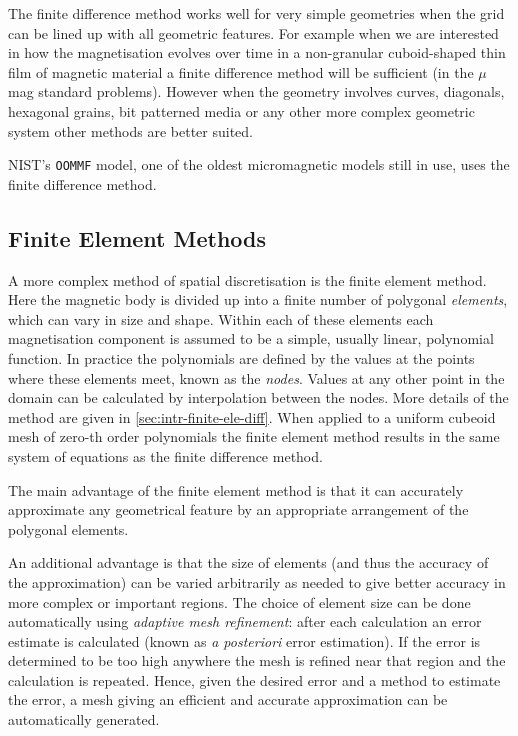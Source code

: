 The finite difference method works well for very simple geometries when the grid can be lined up with all geometric features. 
For example when we are interested in how the magnetisation evolves over time in a non-granular cuboid-shaped thin film of magnetic material a finite difference method will be sufficient (\eg in the $\mu$mag standard problems\cite{mumag-website}). 
However when the geometry involves curves, diagonals, hexagonal grains, bit patterned media or any other more complex geometric system other methods are better suited.

NIST's \texttt{OOMMF} model, one of the oldest micromagnetic models still in use, uses the finite difference method\cite{oommf-website}.


\subsection{Finite Element Methods}
\label{sec:sd-finite-elem-meth}

A more complex method of spatial discretisation is the finite element method\cite{HowardElmanDavidSilvester2006}.
Here the magnetic body is divided up into a finite number of polygonal \emph{elements}, which can vary in size and shape.
Within each of these elements each magnetisation component is assumed to be a simple, usually linear, polynomial function.
In practice the polynomials are defined by the values at the points where these elements meet, known as the \emph{nodes}.
Values at any other point in the domain can be calculated by interpolation between the nodes. More details of the method are given in \autoref{sec:intr-finite-ele-diff}.
When applied to a uniform cubeoid mesh of zero-th order polynomials the finite element method results in the same system of equations as the finite difference method\cite{??ds}.

The main advantage of the finite element method is that it can accurately approximate any geometrical feature by an appropriate arrangement of the polygonal elements.

An additional advantage is that the size of elements (and thus the accuracy of the approximation) can be varied arbitrarily as needed to give better accuracy in more complex or important regions. 
The choice of element size can be done automatically using \emph{adaptive mesh refinement}: after each calculation an error estimate is calculated (known as \emph{a posteriori} error estimation).
If the error is determined to be too high anywhere the mesh is refined near that region and the calculation is repeated.
Hence, given the desired error and a method to estimate the error, a mesh giving an efficient and accurate approximation can be automatically generated.\cite{Schrefl1999}

